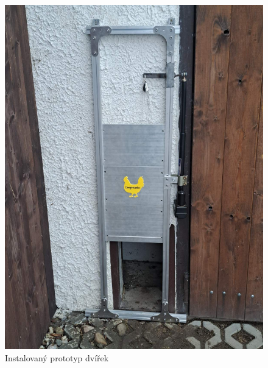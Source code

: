 \begin{figure}[h]
    \centering
    \includegraphics[width=\textwidth]{img/proto_dvirka}
    \caption{Instalovaný prototyp dvířek}
    \label{fig:proto_dvirka}
\end{figure}


